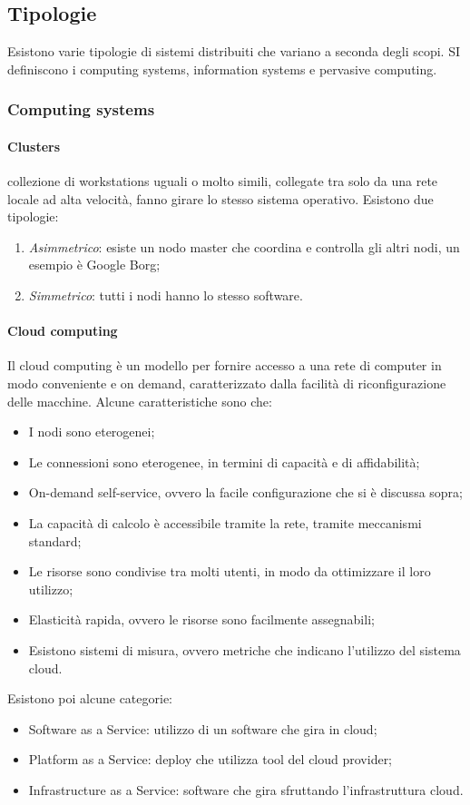 \subsection{Tipologie}
Esistono varie tipologie di sistemi distribuiti che variano a seconda degli 
scopi. SI definiscono i computing systems, information systems e pervasive computing.
\subsubsection{Computing systems}
\paragraph{Clusters} collezione di workstations uguali o molto simili, 
collegate tra solo da una rete locale ad alta velocità, fanno girare lo 
stesso sistema operativo.
Esistono due tipologie:
\begin{enumerate}
    \item \emph{Asimmetrico}: esiste un nodo master che coordina 
    e controlla gli altri nodi, un esempio è Google Borg;
    \item \emph{Simmetrico}: tutti i nodi hanno lo stesso software.
\end{enumerate}

\paragraph{Cloud computing}
Il cloud computing è un modello per fornire accesso a una rete di 
computer in modo conveniente e on demand, caratterizzato dalla 
facilità di riconfigurazione delle macchine.
Alcune caratteristiche sono che:
\begin{itemize}
    \item I nodi sono eterogenei;
    \item Le connessioni sono eterogenee, in termini di capacità e di affidabilità;
    \item On-demand self-service, ovvero la facile configurazione che si è discussa sopra;
    \item La capacità di calcolo è accessibile tramite la rete, tramite meccanismi 
    standard;
    \item Le risorse sono condivise tra molti utenti, in modo da ottimizzare il loro utilizzo;
    \item Elasticità rapida, ovvero le risorse sono facilmente assegnabili;
    \item Esistono sistemi di misura, ovvero metriche che indicano l'utilizzo 
    del sistema cloud.
\end{itemize}
Esistono poi alcune categorie: 
\begin{itemize}
    \item Software as a Service: utilizzo di un software che gira in cloud;
    \item Platform as a Service: deploy che utilizza tool del cloud provider;
    \item Infrastructure as a Service: software che gira sfruttando l'infrastruttura cloud.
\end{itemize}

